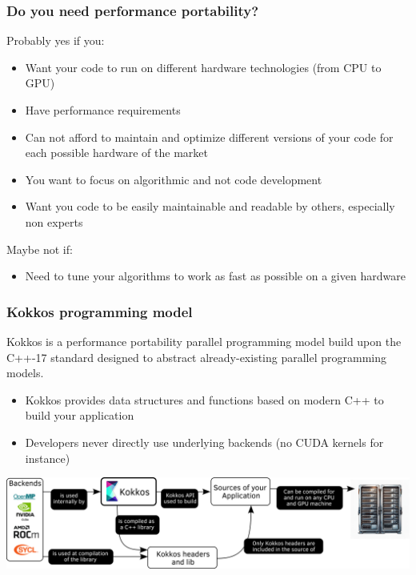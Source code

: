 \documentclass[aspectratio=169]{beamer}
\begin{document}
\begin{frame}
\frametitle{Do you need performance portability?}
Probably yes if you:
\begin{itemize}
    \item Want your code to run on different hardware technologies (from CPU to GPU)
    \item Have performance requirements
    \item Can not afford to maintain and optimize different versions of your code for each possible hardware of the market
    \item You want to focus on algorithmic and not code development
    \item Want you code to be easily maintainable and readable by others, especially non experts
\end{itemize}

Maybe not if:
\begin{itemize}
    \item Need to tune your algorithms to work as fast as possible on a given hardware
\end{itemize}

\end{frame}


\begin{frame}
    \frametitle{Kokkos programming model}

    Kokkos is a performance portability parallel programming model build upon the C++-17 standard designed to abstract already-existing parallel programming models.

    \hspace{0.5cm}

    \begin{itemize}
        \item Kokkos provides data structures and functions based on modern C++ to build your application
        \item Developers never directly use underlying backends (no CUDA kernels for instance)
    \end{itemize}

    \begin{center}
        \includegraphics[width=1\textwidth]{../../images/kokkos_model.png}
    \end{center}

\end{frame}
\end{document}
